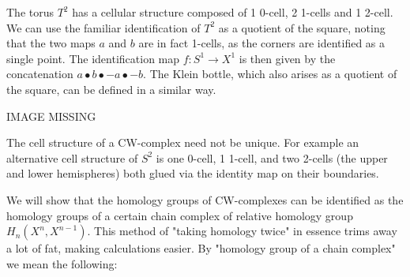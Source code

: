 \begin{example}
The torus $T^2$ has a cellular structure composed of 1 0-cell, 2 1-cells and 1 2-cell. We can use the familiar identification of $T^2$ as a quotient of the square, noting that the two maps $a$ and $b$ are in fact 1-cells, as the corners are identified as a single point. The identification map $f:S^1\rightarrow X^1$ is then given by the concatenation $a\bullet b\bullet -a \bullet -b$. The Klein bottle, which also arises as a quotient of the square, can be defined in a similar way.

IMAGE MISSING
\end{example}

\begin{remark}
The cell structure of a CW-complex need not be unique. For example an alternative cell structure of $S^2$ is one 0-cell, 1 1-cell, and two 2-cells (the upper and lower hemispheres) both glued via the identity map on their boundaries.
\end{remark}

We will show that the homology groups of CW-complexes can be identified as the homology groups of a certain chain complex of relative homology group $H_n(X^n,X^{n-1})$. This method of "taking homology twice" in essence trims away a lot of fat, making calculations easier. By "homology group of a chain complex" we mean the following:

